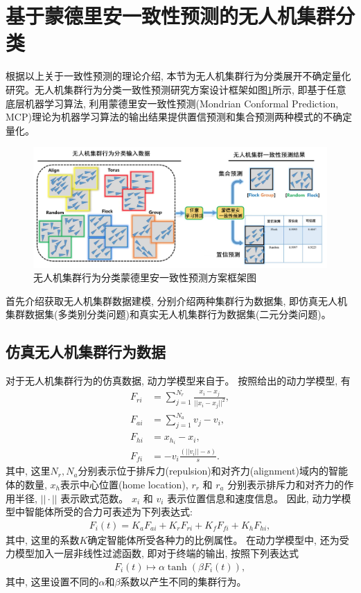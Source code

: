 \section{基于蒙德里安一致性预测的无人机集群分类}
\label{sec:results} 

根据以上关于一致性预测的理论介绍, 本节为无人机集群行为分类展开不确定量化研究。无人机集群行为分类一致性预测研究方案设计框架如图\ref{fig:MCP-framework}所示, 即基于任意底层机器学习算法, 利用蒙德里安一致性预测(Mondrian Conformal Prediction, MCP)理论为机器学习算法的输出结果提供置信预测和集合预测两种模式的不确定量化。

\begin{figure}[]
\centering
\includegraphics[width=1\linewidth]{Img/chapter8/MCP}
\caption{无人机集群行为分类蒙德里安一致性预测方案框架图}
\label{fig:MCP-framework}
\end{figure}

首先介绍获取无人机集群数据建模, 分别介绍两种集群行为数据集, 即仿真无人机集群数据集(多类别分类问题)和真实无人机集群行为数据集(二元分类问题)。

\subsection{仿真无人机集群行为数据}
\label{sec:dynamic}
对于无人机集群行为的仿真数据, 动力学模型来自于\citet{Flocks1987}。 按照\citet{Thomas2021}给出的\citet{Flocks1987}动力学模型, 有
\begin{align}
F_{ri} &= \sum_{j=1}^{N_{r}}\frac{x_{i} - x_{j}}{||x_{i} - x_{j}||^{2}},\\
F_{ai} &= \sum_{j=1}^{N_{a}}v_{j} - v_{i},\\
F_{hi} &= x_{h_{i}} - x_{i},\\
F_{fi} &= -v_{i}\frac{(||v_{i}|| - s)}{s}.
\end{align}
其中, 这里$N_{r}, N_{a}$分别表示位于排斥力(repulsion)和对齐力(alignment)域内的智能体的数量, $x_{h}$表示中心位置(home location), $r_r$ 和 $r_a$ 分别表示排斥力和对齐力的作用半径, $||\cdot||$ 表示欧式范数。 $x_{i}$ 和 $v_{i}$ 表示位置信息和速度信息。 因此, 动力学模型中智能体所受的合力可表述为下列表达式:
\begin{align}
F_{i}(t) = K_{a}F_{ai} + K_{r}F_{ri} + K_{f}F_{fi} + K_{h}F_{hi},
\end{align}  
其中, 这里的系数$K$确定智能体所受各种力的比例属性。 在动力学模型中, 还为受力模型加入一层非线性过滤函数, 即对于终端的输出, 按照下列表达式
\begin{align}
F_{i}(t) \mapsto \alpha \tanh (\beta F_{i}(t)),
\end{align}
其中, 这里设置不同的$\alpha$和$\beta$系数以产生不同的集群行为。

